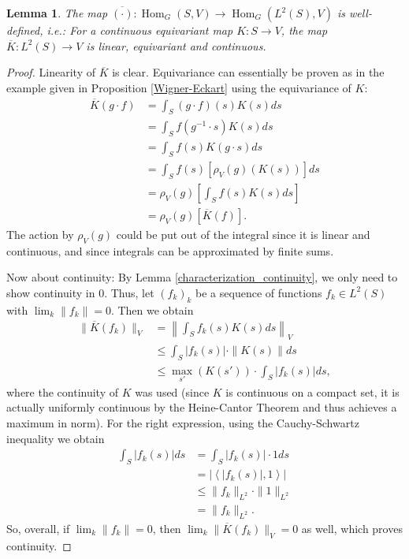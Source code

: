 \documentclass[12pt, a4paper]{article}
\theoremstyle{plain}
\newtheorem{lem}[pro]{Lemma}
\theoremstyle{definition}
\theoremstyle{remark}
\DeclareMathOperator{\Hom}{Hom}
\begin{document}
\begin{lem}\label{well-defined}
The map $\overline{(\cdot)}: \Hom_G(S, V) \to \Hom_{G}(L^2(S), V)$ is well-defined, i.e.: For a continuous equivariant map $K: S \to V$, the map $\overline{K}: L^2(S) \to V$ is linear, equivariant and continuous.
\end{lem}

\begin{proof}
Linearity of $\overline{K}$ is clear. Equivariance can essentially be proven as in the example given in Proposition \ref{Wigner-Eckart} using the equivariance of $K$:
\begin{align*}
\overline{K}(g \cdot f) & = \int_{S} (g \cdot f)(s) K(s) ds \\
& = \int_S f(g^{-1} \cdot s) K(s) ds \\
& = \int_{S} f(s) K(g \cdot s) ds \\
& = \int_{S} f(s) \left[\rho_{V}(g) \left(K(s)\right)\right] ds \\
& = \rho_V(g) \left[ \int_S f(s) K(s) ds \right] \\
& = \rho_V(g)\left[ \overline{K}(f)\right].
\end{align*}
The action by $\rho_V(g)$ could be put out of the integral since it is linear and continuous, and since integrals can be approximated by finite sums. 

Now about continuity: By Lemma \ref{characterization_continuity}, we only need to show continuity in $0$. Thus, let $(f_k)_k$ be a sequence of functions $f_k \in L^2(S)$ with $\lim_k \|f_k\| = 0$. Then we obtain
\begin{align*}
\|\overline{K}(f_k)\|_V & = \left\| \int_S f_k(s) K(s) ds \right\|_V \\
& \leq \int_S |f_k(s)| \cdot \|K(s)\| ds \\
& \leq \max_{s'} \left( K(s') \right)  \cdot \int_S |f_k(s)| ds,
\end{align*}
where the continuity of $K$ was used (since $K$ is continuous on a compact set, it is actually uniformly continuous by the Heine-Cantor Theorem and thus achieves a maximum in norm). For the right expression, using the Cauchy-Schwartz inequality we obtain
\begin{align*}
\int_S |f_k(s)| ds & = \int_S |f_k(s)| \cdot 1 ds \\
& = \left| \left\langle |f_k(s)|, 1 \right\rangle \right| \\
& \leq \|f_k\|_{L^2} \cdot \|1\|_{L^2} \\
& = \|f_k\|_{L^2}.
\end{align*}
So, overall, if $\lim_k\|f_k\| = 0$, then $\lim_k \|\overline{K}(f_k)\|_V = 0$ as well, which proves continuity.
\end{proof}
\end{document}
